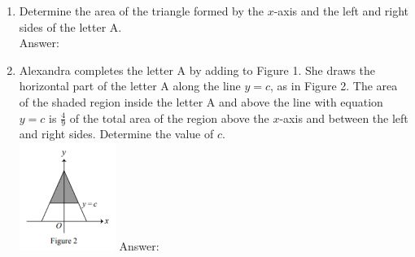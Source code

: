 \documentclass[12pt]{extarticle}
\begin{document}
\begin{enumerate}
{\begin{enumerate}
        \item {Determine the area of the triangle formed by the $x$-axis and the left and right sides of the letter A. \\Answer: }
        \item {Alexandra completes the letter A by adding to Figure 1. She draws the horizontal part of the letter A along the line $y = c$, as in Figure 2. The area of the shaded region inside the letter A and above the line with equation $y = c$ is $\frac{4}{9}$ of the total area of the region above the $x$-axis and between the left and right sides. Determine the value of $c$.\\
        \includegraphics{CSMC2018_B1d.png} Answer: }
    \end{enumerate}}
\end{enumerate}
\end{document}
